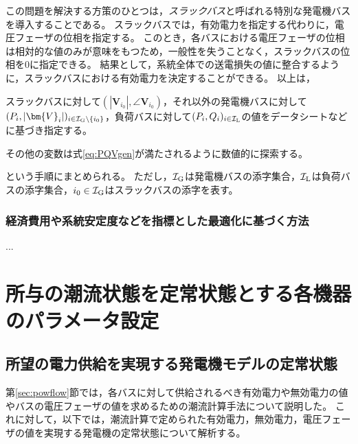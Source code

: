 \documentclass[tombow,dvipdfmx]{corona-a5}
\begin{document}
この問題を解決する方策のひとつは，\emph{スラックバス}と呼ばれる特別な発電機バスを導入することである。
スラックバスでは，有効電力を指定する代わりに，電圧フェーザの位相を指定する。
このとき，各バスにおける電圧フェーザの位相は相対的な値のみが意味をもつため，一般性を失うことなく，スラックバスの位相を0に指定できる。
結果として，系統全体での送電損失の値に整合するように，スラックバスにおける有効電力を決定することができる。
以上は，
\begin{手順}
\item スラックバスに対して$(|\bm{V}_{i_0}|,\angle \bm{V}_{i_0})$，それ以外の発電機バスに対して$(P_i,|\bm{V}_{i}|)_{i \in \mathcal{I}_{\rm G}\setminus\{i_0\} }$，負荷バスに対して$(P_i,Q_i)_{i \in \mathcal{I}_{\rm L}}$の値をデータシートなどに基づき指定する。
\item その他の変数は式\ref{eq:PQVgen}が満たされるように数値的に探索する。
\end{手順}
という手順にまとめられる。
ただし，$\mathcal{I}_{\rm G}$は発電機バスの添字集合，$\mathcal{I}_{\rm L}$は負荷バスの添字集合，$i_0 \in \mathcal{I}_{\rm G}$はスラックバスの添字を表す。


\subsubsection{経済費用や系統安定度などを指標とした最適化に基づく方法}

...

\section{所与の潮流状態を定常状態とする各機器のパラメータ設定}\label{sec:paradef}

\subsection{所望の電力供給を実現する発電機モデルの定常状態}\label{sec:stagen}

第\ref{sec:powflow}節では，各バスに対して供給されるべき有効電力や無効電力の値やバスの電圧フェーザの値を求めるための潮流計算手法について説明した。
これに対して，以下では，潮流計算で定められた有効電力，無効電力，電圧フェーザの値を実現する発電機の定常状態について解析する。
\end{document}
